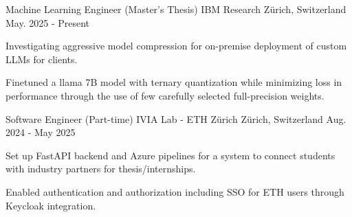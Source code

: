 

\begin{cventries}

  \cventry
    {Machine Learning Engineer (Master's Thesis)} %
    {IBM Research} %
    {Zürich, Switzerland} %
    {May. 2025 - Present} %
    {
      \begin{cvitems} %
        \item {Investigating aggressive model compression for on-premise deployment of custom LLMs for clients.}
        \item {Finetuned a llama 7B model with ternary quantization while minimizing loss in performance through the
        use of few carefully selected full-precision weights.}
      \end{cvitems}
    }

  \cventry
    {Software Engineer (Part-time)} %
    {IVIA Lab - ETH Zürich} %
    {Zürich, Switzerland} %
    {Aug. 2024 - May 2025} %
    {
      \begin{cvitems} %
        \item {Set up FastAPI backend and Azure pipelines for a system to connect students with industry partners for thesis/internships.}
        \item {Enabled authentication and authorization including SSO for ETH users through Keycloak integration.}
      \end{cvitems}
    }


\end{cventries}
